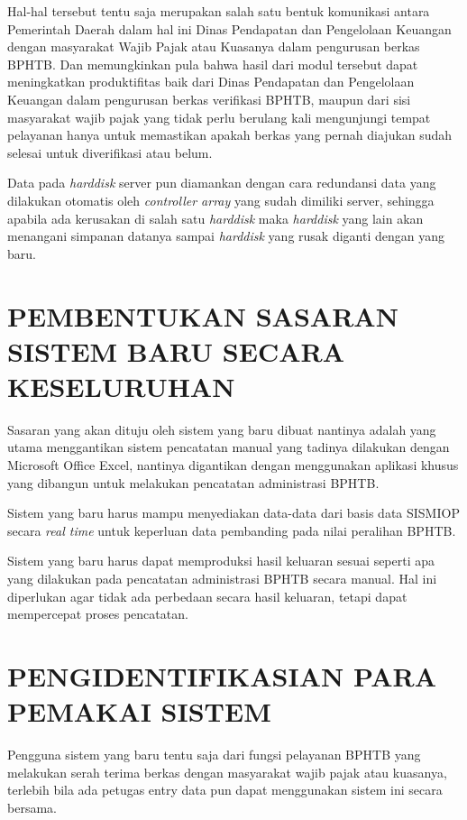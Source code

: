 \documentclass[pdftex,12pt, oneside]{article}
\begin{document}
Hal-hal tersebut tentu saja merupakan salah satu bentuk komunikasi antara Pemerintah Daerah dalam hal ini Dinas Pendapatan dan Pengelolaan Keuangan dengan masyarakat Wajib Pajak atau Kuasanya dalam pengurusan berkas BPHTB. Dan memungkinkan pula bahwa hasil dari modul tersebut dapat meningkatkan produktifitas baik dari Dinas Pendapatan dan Pengelolaan Keuangan dalam pengurusan berkas verifikasi BPHTB, maupun dari sisi masyarakat wajib pajak yang tidak perlu berulang kali mengunjungi tempat pelayanan hanya untuk memastikan apakah berkas yang pernah diajukan sudah selesai untuk diverifikasi atau belum.

Data pada \textit{harddisk} server pun diamankan dengan cara redundansi data yang dilakukan otomatis oleh \textit{controller array} yang sudah dimiliki server, sehingga apabila ada kerusakan di salah satu \textit{harddisk} maka \textit{harddisk} yang lain akan menangani simpanan datanya sampai \textit{harddisk} yang rusak diganti dengan yang baru.

\section{PEMBENTUKAN SASARAN SISTEM BARU SECARA KESELURUHAN}

Sasaran yang akan dituju oleh sistem yang baru dibuat nantinya adalah yang utama menggantikan sistem pencatatan manual yang tadinya dilakukan dengan Microsoft Office Excel, nantinya digantikan dengan menggunakan aplikasi khusus yang dibangun untuk melakukan pencatatan administrasi BPHTB.

Sistem yang baru harus mampu menyediakan data-data dari basis data SISMIOP secara \textit{real time} untuk keperluan data pembanding pada nilai peralihan BPHTB. 

Sistem yang baru harus dapat memproduksi hasil keluaran sesuai seperti apa yang dilakukan pada pencatatan administrasi BPHTB secara manual. Hal ini diperlukan agar tidak ada perbedaan secara hasil keluaran, tetapi dapat mempercepat proses pencatatan.

\section{PENGIDENTIFIKASIAN PARA PEMAKAI SISTEM}

Pengguna sistem yang baru tentu saja dari fungsi pelayanan BPHTB yang melakukan serah terima berkas dengan masyarakat wajib pajak atau kuasanya, terlebih bila ada petugas entry data pun dapat menggunakan sistem ini secara bersama.
\end{document}
